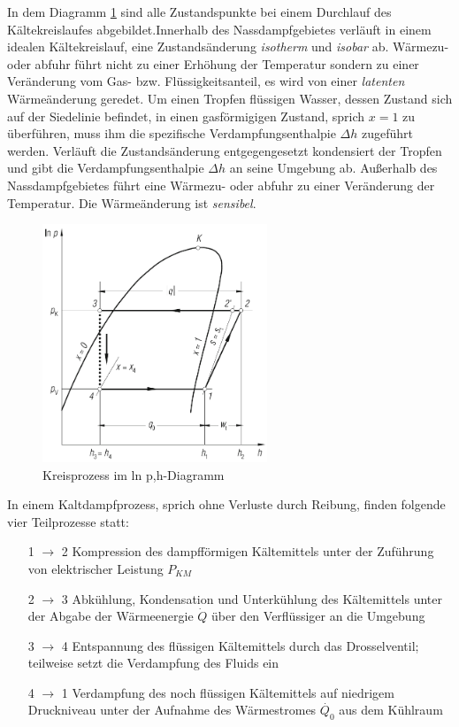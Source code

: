 In dem Diagramm \ref{fig:Komponeneten und p-h-Diagramm} sind alle Zustandspunkte bei einem Durchlauf des Kältekreislaufes abgebildet.Innerhalb des Nassdampfgebietes verläuft in einem idealen Kältekreislauf, eine Zustandsänderung \textit{isotherm} und \textit{isobar} ab. Wärmezu- oder abfuhr führt nicht zu einer Erhöhung der Temperatur sondern zu einer Veränderung vom Gas- bzw. Flüssigkeitsanteil, es wird von einer \textit{latenten} Wärmeänderung geredet. Um einen Tropfen flüssigen Wasser, dessen Zustand sich auf der Siedelinie befindet, in einen gasförmigigen Zustand, sprich $x=1$ zu überführen, muss ihm die spezifische Verdampfungsenthalpie $\Delta h$ zugeführt werden. Verläuft die Zustandsänderung entgegengesetzt kondensiert der Tropfen und gibt die Verdampfungsenthalpie $\Delta h$ an seine Umgebung ab. 
Außerhalb des Nassdampfgebietes führt eine Wärmezu- oder abfuhr zu einer Veränderung der Temperatur. Die Wärmeänderung ist \textit{sensibel}. 

\begin{figure}[htb]
\centering		
\includegraphics[width=0.6\textwidth]{Pictures/log_p_h_Beahr.png}
\caption{Kreisprozess im ln p,h-Diagramm \citep{Baehr2013}}
\label{fig:Komponeneten und p-h-Diagramm}
\end{figure}


In einem  Kaltdampfprozess, sprich ohne Verluste durch Reibung, finden folgende vier Teilprozesse statt:

\begin{itemize}
\item[1 $\longrightarrow$ 2] Kompression des dampfförmigen Kältemittels unter der Zuführung von elektrischer Leistung $P_{KM}$
\item[2 $\longrightarrow$ 3] Abkühlung, Kondensation und Unterkühlung des Kältemittels unter der Abgabe der Wärmeenergie $\dot{Q}$ über den Verflüssiger an die Umgebung
\item[3 $\longrightarrow$ 4] Entspannung des flüssigen Kältemittels durch das Drosselventil; teilweise setzt die Verdampfung des Fluids ein 
\item[4 $\longrightarrow$ 1] Verdampfung des noch flüssigen Kältemittels auf niedrigem Druckniveau unter der Aufnahme des Wärmestromes $\dot{Q_0}$ aus dem Kühlraum
\end{itemize}

